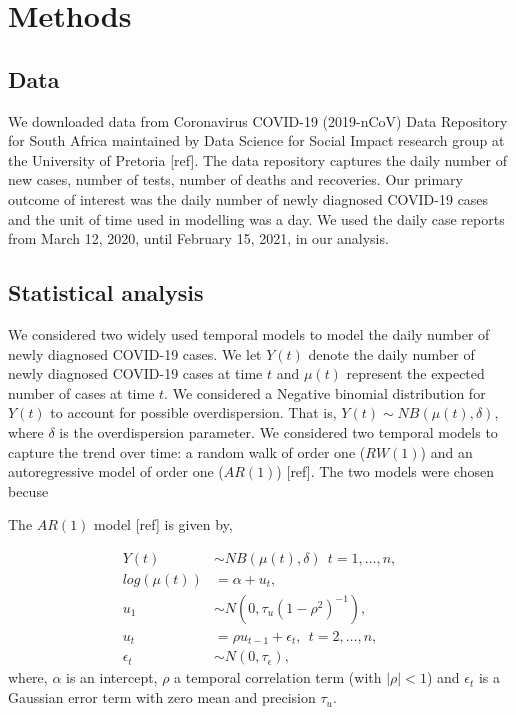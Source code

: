 \documentclass[10pt,letterpaper]{article}
\begin{document}
\hypertarget{methods}{%
\section{Methods}\label{methods}}

\hypertarget{data}{%
\subsection{Data}\label{data}}

We downloaded data from Coronavirus COVID-19 (2019-nCoV) Data Repository
for South Africa maintained by Data Science for Social Impact research
group at the University of Pretoria {[}ref{]}. The data repository
captures the daily number of new cases, number of tests, number of
deaths and recoveries. Our primary outcome of interest was the daily
number of newly diagnosed COVID-19 cases and the unit of time used in
modelling was a day. We used the daily case reports from March 12, 2020,
until February 15, 2021, in our analysis.

\hypertarget{statistical-analysis}{%
\subsection{Statistical analysis}\label{statistical-analysis}}

We considered two widely used temporal models to model the daily number
of newly diagnosed COVID-19 cases. We let \(Y(t)\) denote the daily
number of newly diagnosed COVID-19 cases at time \(t\) and \(\mu(t)\)
represent the expected number of cases at time \(t\). We considered a
Negative binomial distribution for \(Y(t)\) to account for possible
overdispersion. That is, \(Y(t) \sim NB(\mu(t), \delta)\), where
\(\delta\) is the overdispersion parameter. We considered two temporal
models to capture the trend over time: a random walk of order one
(\(RW(1)\)) and an autoregressive model of order one (\(AR(1)\))
{[}ref{]}. The two models were chosen becuse

The \(AR(1)\) model {[}ref{]} is given by,

\[
\begin{aligned}
 Y(t) &\sim NB(\mu(t), \delta) \ \ t=1, \dots, n,\\
 log(\mu(t)) &= \alpha+u_t, \\
 u_1 &\sim N(0, \tau_u(1-\rho^2)^{-1}),  \\
  u_t &=\rho u_{t-1} +\epsilon_t, \ \ t=2, \dots, n,  \\
  \epsilon_t & \sim N(0, \tau_{\epsilon}),
\end{aligned}
\] where, \(\alpha\) is an intercept, \(\rho\) a temporal correlation
term (with \(|\rho|<1\)) and \(\epsilon_t\) is a Gaussian error term
with zero mean and precision \(\tau_u\).
\end{document}
